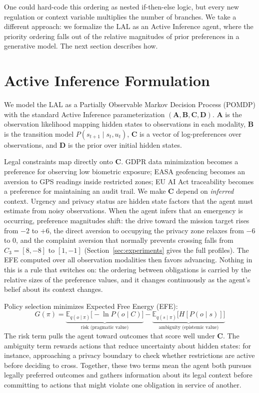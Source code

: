 \documentclass[10pt,twocolumn]{article}
\begin{document}
One could hard-code this ordering as nested if-then-else logic, but every new regulation or context variable multiplies the number of branches. We take a different approach: we formalize the LAL as an Active Inference agent, where the priority ordering falls out of the relative magnitudes of prior preferences in a generative model. The next section describes how.


\section{Active Inference Formulation}
\label{sec:aif}

We model the LAL as a Partially Observable Markov Decision Process (POMDP) with the standard Active Inference parameterization $(\mathbf{A}, \mathbf{B}, \mathbf{C}, \mathbf{D})$. $\mathbf{A}$ is the observation likelihood mapping hidden states to observations in each modality, $\mathbf{B}$ is the transition model $P(s_{t+1} \mid s_t, u_t)$, $\mathbf{C}$ is a vector of log-preferences over observations, and $\mathbf{D}$ is the prior over initial hidden states.

Legal constraints map directly onto $\mathbf{C}$. GDPR data minimization becomes a preference for observing low biometric exposure; EASA geofencing becomes an aversion to GPS readings inside restricted zones; EU AI Act traceability becomes a preference for maintaining an audit trail. We make $\mathbf{C}$ depend on \textit{inferred} context. Urgency and privacy status are hidden state factors that the agent must estimate from noisy observations. When the agent infers that an emergency is occurring, preference magnitudes shift: the drive toward the mission target rises from $-2$ to $+6$, the direct aversion to occupying the privacy zone relaxes from $-6$ to $0$, and the complaint aversion that normally prevents crossing falls from $C_3 = [8, -8]$ to $[1, -1]$ (Section~\ref{sec:experiments} gives the full profiles). The EFE computed over all observation modalities then favors advancing. Nothing in this is a rule that switches on: the ordering between obligations is carried by the relative sizes of the preference values, and it changes continuously as the agent's belief about its context changes.

Policy selection minimizes Expected Free Energy (EFE):
\begin{equation}
    G(\pi) = \underbrace{\mathbb{E}_{q(o \mid \pi)}\bigl[-\ln P(o \mid C)\bigr]}_{\text{risk (pragmatic value)}} - \underbrace{\mathbb{E}_{q(s \mid \pi)}\bigl[H[P(o \mid s)]\bigr]}_{\text{ambiguity (epistemic value)}}
    \label{eq:efe}
\end{equation}
The risk term pulls the agent toward outcomes that score well under $\mathbf{C}$. The ambiguity term rewards actions that reduce uncertainty about hidden states: for instance, approaching a privacy boundary to check whether restrictions are active before deciding to cross. Together, these two terms mean the agent both pursues legally preferred outcomes and gathers information about its legal context before committing to actions that might violate one obligation in service of another.
\end{document}
